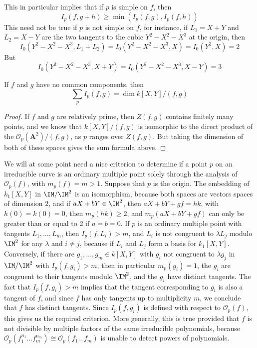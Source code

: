 This in particular implies that if $p$ is simple on $f$, then
%
\[ I_p(f,g + h) \geq \min(I_p(f,g), I_p(f,h)) \]
%
This need not be true if $p$ is not simple on $f$, for instance, if $L_1 = X + Y$ and $L_2 = X - Y$ are the two tangents to the cubic $Y^2 - X^2 - X^3$ at the origin, then
%
\[ I_0(Y^2 - X^2 - X^3, L_1 + L_2) = I_0(Y^2 - X^2 - X^3, X) = I_0(Y^2,X) = 2 \]
%
But
%
\[ I_0(Y^2 - X^2 - X^3, X + Y) = I_0(Y^2 - X^2 - X^3, X - Y) = 3 \]

\begin{theorem}
    If $f$ and $g$ have no common components, then
    \[ \sum_p I_p(f,g) = \dim k[X,Y]/(f,g) \]
\end{theorem}
\begin{proof}
    If $f$ and $g$ are relatively prime, then $Z(f,g)$ contains finitely many points, and we know that $k[X,Y]/(f,g)$ is isomorphic to the direct product of the $\mathcal{O}_p(\mathbf{A}^2)/(f,g)$, as $p$ ranges over $Z(f,g)$. But taking the dimension of both of these spaces gives the sum formula above.
\end{proof}

We will at some point need a nice criterion to determine if a point $p$ on an irreducible curve is an ordinary multiple point solely through the analysis of $\mathcal{O}_p(f)$, with $m_p(f) = m > 1$. Suppose that $p$ is the origin. The embedding of $k_1[X,Y]$ in $\IM/\IM^2$ is an isomorphism, because both spaces are vectors spaces of dimension $2$, and if $aX + bY \in \IM^2$, then $aX + bY + gf = hk$, with $h(0) = k(0) = 0$, then $m_p(hk) \geq 2$, and $m_p(aX + bY + gf)$ can only be greater than or equal to 2 if $a = b = 0$. If $p$ is an ordinary multiple point with tangents $L_1, \dots, L_m$, then $I_p(f,L_i) > m$, and $L_i$ is not congruent to $\lambda L_j$ modulo $\IM^2$ for any $\lambda$ and $i \neq j$, because if $L_i$ and $L_j$ form a basis for $k_1[X,Y]$. Conversely, if there are $g_1, \dots, g_m \in k[X,Y]$ with $g_i$ not congruent to $\lambda g_j$ in $\IM/\IM^2$ with $I_p(f,g_i) > m$, then in particular $m_p(g_i) = 1$, the $g_i$ are congruent to their tangents modulo $\IM^2$, and the $g_i$ have distinct tangents. The fact that $I_p(f,g_i) > m$ implies that the tangent corresponding to $g_i$ is also a tangent of $f$, and since $f$ has only tangents up to multiplicity $m$, we conclude that $f$ has distinct tangents. Since $I_p(f,g_i)$ is defined with respect to $\mathcal{O}_p(f)$, this gives us the required criterion. More generally, this is true provided that $f$ is not divisible by multiple factors of the same irreducible polynomials, because $\mathcal{O}_p(f_1^{n_1} \dots f_m^{n_m}) \cong \mathcal{O}_p(f_1 \dots f_m)$ is unable to detect powers of polynomials.







